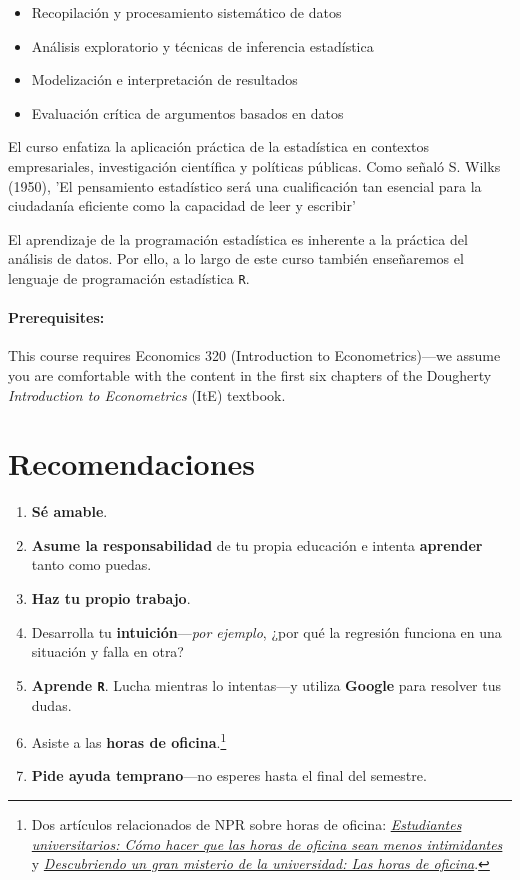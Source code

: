 \documentclass[10pt]{article}
\begin{document}
\begin{itemize}
\item Recopilación y procesamiento sistemático de datos
\item Análisis exploratorio y técnicas de inferencia estadística
\item Modelización e interpretación de resultados
\item Evaluación crítica de argumentos basados en datos
\end{itemize}


El curso enfatiza la aplicación práctica de la estadística en contextos empresariales, investigación científica y políticas públicas. Como señaló S. Wilks (1950), 'El pensamiento estadístico será una cualificación tan esencial para la ciudadanía eficiente como la capacidad de leer y escribir'

El aprendizaje de la programación estadística es inherente a la práctica del análisis de datos. Por ello, a lo largo de este curso también enseñaremos el lenguaje de programación estadística \texttt{{R}}.

\paragraph{Prerequisites:} This course requires Economics 320 (Introduction to Econometrics)---we assume you are comfortable with the content in the first six chapters of the Dougherty \textit{Introduction to Econometrics} (ItE) textbook.


\section*{Recomendaciones}

\begin{enumerate}
	\item \textbf{Sé amable}.
	\item \textbf{Asume la responsabilidad} de tu propia educación e intenta \textbf{aprender} tanto como puedas.
	\item \textbf{Haz tu propio trabajo}.
	\item Desarrolla tu \textbf{intuición}---\textit{por ejemplo}, ¿por qué la regresión funciona en una situación y falla en otra?
	\item \textbf{Aprende \texttt{R}}. Lucha mientras lo intentas---y utiliza \textbf{Google} para resolver tus dudas.
	\item Asiste a las \textbf{horas de oficina}.\footnote{Dos artículos relacionados de NPR sobre horas de oficina: \href{https://www.npr.org/2019/10/05/678815966/college-students-how-to-make-office-hours-less-scary}{\textit{Estudiantes universitarios: Cómo hacer que las horas de oficina sean menos intimidantes}} y \href{https://www.npr.org/2019/10/02/766568824/uncovering-a-huge-mystery-of-college-office-hours}{\textit{Descubriendo un gran misterio de la universidad: Las horas de oficina}}.}
	\item \textbf{Pide ayuda temprano}---no esperes hasta el final del semestre.
\end{enumerate}
\end{document}
